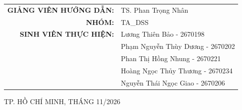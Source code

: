 \begin{titlepage}
	\vspace{0.5cm}
	\begin{center}
		\begin{tabular}{rl}
			\textbf{GIẢNG VIÊN HƯỚNG DẪN:} & TS. Phan Trọng Nhân \\
			\textbf{NHÓM:}                 & TA\_DSS \\
			\textbf{SINH VIÊN THỰC HIỆN:}  & Lương Thiên Bảo - 2670198 \\
			                               & Phạm Nguyễn Thùy Dương - 2670202 \\
			                               & Phan Thị Hồng Nhung - 2670221 \\
			                               & Hoàng Ngọc Thủy Thương - 2670234 \\
			                               & Nguyễn Thái Ngọc Giao - 2670206
		\end{tabular}
	\end{center}

	\vfill
	\begin{center}
		{\footnotesize TP. HỒ CHÍ MINH, THÁNG 11/2026}
	\end{center}
	\vspace*{0.5cm}
\end{titlepage}
